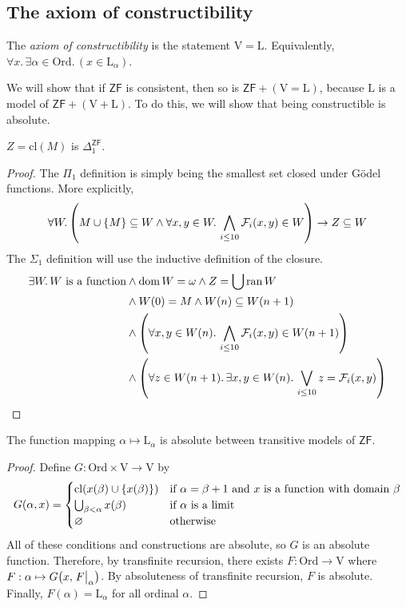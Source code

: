\subsection{The axiom of constructibility}
\begin{definition}
    The \emph{axiom of constructibility} is the statement \( \mathrm{V} = \mathrm{L} \).
    Equivalently, \( \forall x.\, \exists \alpha \in \mathrm{Ord}.\, (x \in \mathrm{L}_\alpha) \).
\end{definition}
We will show that if \( \mathsf{ZF} \) is consistent, then so is \( \mathsf{ZF} + (\mathrm{V} = \mathrm{L}) \), because \( \mathrm{L} \) is a model of \( \mathsf{ZF} + (\mathrm{V} + \mathrm{L}) \).
To do this, we will show that being constructible is absolute.
\begin{lemma}
    \( Z = \mathrm{cl}(M) \) is \( \Delta_1^{\mathsf{ZF}} \).
\end{lemma}
\begin{proof}
    The \( \Pi_1 \) definition is simply being the smallest set closed under G\"odel functions.
    More explicitly,
    \[ \forall W.\, \qty(M \cup \qty{M} \subseteq W \wedge \forall x, y \in W.\, \bigwedge_{i \leq 10} \mathcal F_i(x, y) \in W) \to Z \subseteq W \]
    The \( \Sigma_1 \) definition will use the inductive definition of the closure.
    \begin{align*}
        \exists W.\, W \text{ is a function} &\wedge \operatorname{dom} W = \omega \wedge Z = \bigcup \operatorname{ran} W \\
        &\wedge W(0) = M \wedge W(n) \subseteq W(n+1) \\
        &\wedge \qty(\forall x, y \in W(n).\, \bigwedge_{i \leq 10} \mathcal F_i(x, y) \in W(n+1)) \\
        &\wedge \qty(\forall z \in W(n+1).\, \exists x, y \in W(n).\, \bigvee_{i \leq 10} z = \mathcal F_i(x, y))
    \end{align*}
\end{proof}
\begin{lemma}
    The function mapping \( \alpha \mapsto \mathrm{L}_\alpha \) is absolute between transitive models of \( \mathsf{ZF} \).
\end{lemma}
\begin{proof}
    Define \( G : \mathrm{Ord} \times \mathrm{V} \to \mathrm{V} \) by
    \[ G(\alpha, x) = \begin{cases}
        \mathrm{cl}(x(\beta) \cup \qty{x(\beta)}) & \text{if } \alpha = \beta + 1 \text{ and } x \text{ is a function with domain } \beta \\
        \bigcup_{\beta < \alpha} x(\beta) & \text{if } \alpha \text{ is a limit} \\
        \varnothing & \text{otherwise}
    \end{cases} \]
    All of these conditions and constructions are absolute, so \( G \) is an absolute function.
    Therefore, by transfinite recursion, there exists \( F : \mathrm{Ord} \to \mathrm{V} \) where \( F : \alpha \mapsto G\qty(x, \eval{F}_\alpha) \).
    By absoluteness of transfinite recursion, \( F \) is absolute.
    Finally, \( F(\alpha) = \mathrm{L}_\alpha \) for all ordinal \( \alpha \).
\end{proof}
